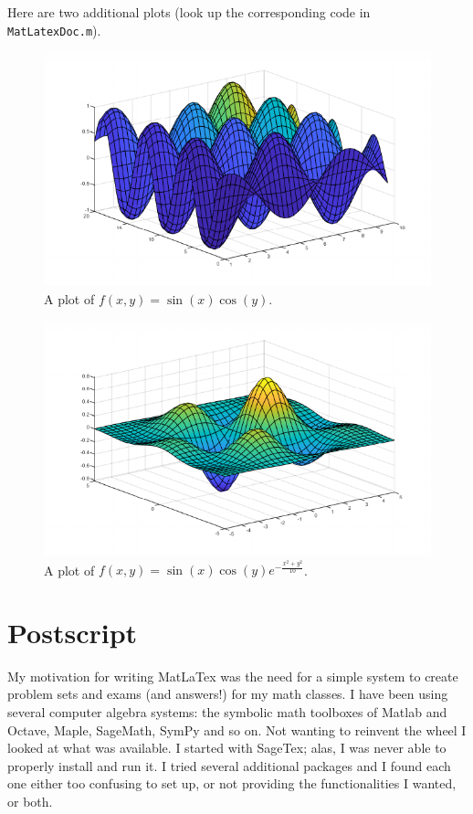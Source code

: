 \documentclass{article}
\begin{document}
\begin{enumerate}
  Here are two additional plots (look up the corresponding code in \texttt{MatLatexDoc.m}). 
  \begin{figure}[H] 
  \centering 
  \includegraphics[scale=0.85]{FIG002} 
  \caption{A plot of \(f(x,y)=\sin(x)\cos(y)\).} 
  \end{figure} 
  \begin{figure}[H] 
  \centering 
  \includegraphics[scale=0.85]{FIG003} 
  \caption{A plot of \(f(x,y)=\sin(x)\cos(y) e^{-\frac{x^2+y^2}{10}}\).} 
  \end{figure} 
  \end{enumerate} 
  
  \section{Postscript} 
  My motivation for writing \textsf{MatLaTex} was the need for a simple system to create problem sets and exams  
  (and answers!) for my math classes. I have been using several computer algebra systems:  
  the symbolic math toolboxes of \textsf{Matlab} and \textsf{Octave}, \textsf{Maple}, \textsf{SageMath}, \textsf{SymPy} and so on. 
  Not wanting to reinvent the wheel I looked at what was available. I started with \textsf{SageTex}; alas, I was 
  never able to properly install and run it. I tried several additional packages and I found each one either  
  too confusing to set up, or not providing the functionalities I wanted, or both. 
   
\end{document}
